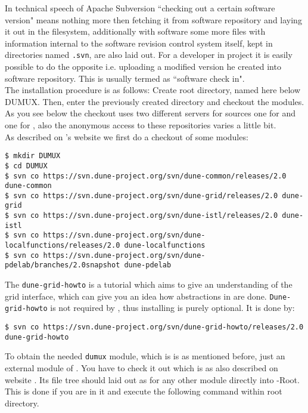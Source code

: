 In technical speech of Apache Subversion ``checking out a certain software version" means nothing more then fetching 
it from software repository and laying it out in the filesystem, additionally with software some more files with information internal to the software revision control system itself, kept in directories named \texttt{.svn}, are also laid out.
For a developer in \Dumux project it is easily possible to do the opposite i.e. uploading a modified version he created into software repository. This is usually termed as ``software check in".\\

The installation procedure is as follows:
Create {\Dune} root directory, named here below DUMUX.
Then, enter the previously created directory and checkout the modules. 
As you see below the checkout uses two different servers for sources one for \Dune and one for \Dumux, also the 
anonymous access to these repositories varies a little bit.\\ 

As described on \Dune's website \cite{DUNE-DOWNLOAD-SVN} we first do a checkout of some \Dune modules:

\begin{lstlisting}[style=Bash]
$ mkdir DUMUX
$ cd DUMUX
$ svn co https://svn.dune-project.org/svn/dune-common/releases/2.0 dune-common
$ svn co https://svn.dune-project.org/svn/dune-grid/releases/2.0 dune-grid
$ svn co https://svn.dune-project.org/svn/dune-istl/releases/2.0 dune-istl
$ svn co https://svn.dune-project.org/svn/dune-localfunctions/releases/2.0 dune-localfunctions
$ svn co https://svn.dune-project.org/svn/dune-pdelab/branches/2.0snapshot dune-pdelab
\end{lstlisting}

The \texttt{dune-grid-howto} is a tutorial which aims to give an understanding of the \Dune grid interface, which can 
give you an idea how abstractions in \Dune are done. \texttt{Dune-grid-howto} is not required by \Dumux, thus installing is purely optional. It is done by: 

\begin{lstlisting}[style=Bash]
$ svn co https://svn.dune-project.org/svn/dune-grid-howto/releases/2.0 dune-grid-howto
\end{lstlisting}

To obtain the needed \texttt{dumux} module, which is is as mentioned before, just an external module of \Dune. You have to check it out which is as also described on \Dumux website \cite{DUMUX-HP}.
Its file tree should laid out as for any other \Dune module directly into \Dune-Root. This is done if you are in it and execute the following command within \Dune root directory.

